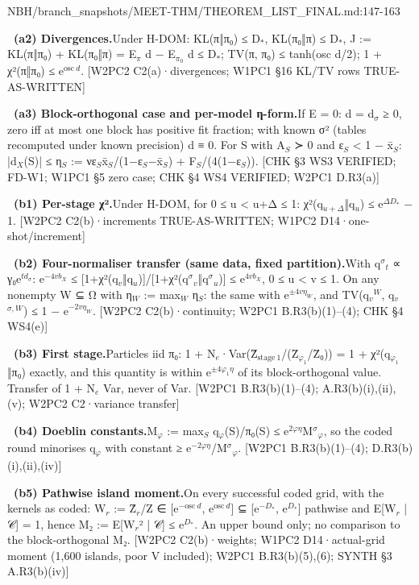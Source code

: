 \begin{stmt}{NBH/branch_snapshots/MEET-THM/THEOREM_LIST_FINAL.md:147-163}
\par\smallskip\noindent\textbf{\ (a2) Divergences.}\enspace Under H-DOM: KL(π‖π₀) ≤ D$_{*}$, KL(π₀‖π) ≤ D$_{*}$, J := KL(π‖π₀) + KL(π₀‖π) = E$_{π}$ d − E$_{π_{0}}$ d ≤ D$_{*}$; TV(π, π₀) ≤ tanh(osc d/2); 1 + χ²(π‖π₀) ≤ e$^{\mathrm{osc}\ d}$. [W2PC2 C2(a)·divergences; W1PC1 §16 KL/TV rows TRUE-AS-WRITTEN]
\par\smallskip\noindent\textbf{\ (a3) Block-orthogonal case and per-model η-form.}\enspace If E = 0: d = d$_{σ}$ ≥ 0, zero iff at most one block has positive fit fraction; with known σ² (tables recomputed under known precision) d ≡ 0. For S with A$_{S}$ ≻ 0 and ε$_{S}$ \textless{} 1 − x̄$_{S}$: |d$_{X}$(S)| ≤ η$_{S}$ := νε$_{S}$x̄$_{S}$/(1−ε$_{S}$−x̄$_{S}$) + F$_{S}$/(4(1−ε$_{S}$)). [CHK §3 WS3 VERIFIED; FD-W1; W1PC1 §5 zero case; CHK §4 WS4 VERIFIED; W2PC1 D.R3(a)]
\par\smallskip\noindent\textbf{\ (b1) Per-stage χ².}\enspace Under H-DOM, for 0 ≤ u \textless{} u+Δ ≤ 1: χ²(q$_{u+Δ}$‖q$_{u}$) ≤ e$^{ΔD_{*}}$ − 1. [W2PC2 C2(b)·increments TRUE-AS-WRITTEN; W1PC2 D14·one-shot/increment]
\par\smallskip\noindent\textbf{\ (b2) Four-normaliser transfer (same data, fixed partition).}\enspace With q$^{σ}$$_{t}$ ∝ γ₀e$^{td_{σ}}$: e$^{−4vb_{X}}$ ≤ [1+χ²(q$_{v}$‖q$_{u}$)]/[1+χ²(q$^{σ}$$_{v}$‖q$^{σ}$$_{u}$)] ≤ e$^{4vb_{X}}$, 0 ≤ u \textless{} v ≤ 1. On any nonempty W ⊆ Ω with η$_{W}$ := max$_{W}$ η$_{S}$: the same with e$^{±4vη_{W}}$, and TV(q$_{v}$$^{W}$, q$_{v}$$^{σ,W}$) ≤ 1 − e$^{−2vη_{W}}$. [W2PC2 C2(b)·continuity; W2PC1 B.R3(b)(1)–(4); CHK §4 WS4(e)]
\par\smallskip\noindent\textbf{\ (b3) First stage.}\enspace Particles iid π₀: 1 + N$_{e}$·Var(Ẑ$_{\mathrm{stage}\ 1}$/(Z̄$_{φ_{1}}$/Z̄₀)) = 1 + χ²(q$_{φ_{1}}$‖π₀) exactly, and this quantity is within e$^{±4φ_{1}η}$ of its block-orthogonal value. Transfer of 1 + N$_{e}$ Var, never of Var. [W2PC1 B.R3(b)(1)–(4); A.R3(b)(i),(ii),(v); W2PC2 C2·variance transfer]
\par\smallskip\noindent\textbf{\ (b4) Doeblin constants.}\enspace M$_{φ}$ := max$_{S}$ q$_{φ}$(S)/π₀(S) ≤ e$^{2φη}$M$^{σ}$$_{φ}$, so the coded round minorises q$_{φ}$ with constant ≥ e$^{−2φη}$/M$^{σ}$$_{φ}$. [W2PC1 B.R3(b)(1)–(4); D.R3(b)(i),(ii),(iv)]
\par\smallskip\noindent\textbf{\ (b5) Pathwise island moment.}\enspace On every successful coded grid, with the kernels as coded: W$_{r}$ := Ẑ$_{r}$/Z ∈ [e$^{−\mathrm{osc}\ d}$, e$^{\mathrm{osc}\ d}$] ⊆ [e$^{−D_{*}}$, e$^{D_{*}}$] pathwise and E[W$_{r}$ | 𝒞] = 1, hence M₂ := E[W$_{r}$² | 𝒞] ≤ e$^{D_{*}}$. An upper bound only; no comparison to the block-orthogonal M₂. [W2PC2 C2(b)·weights; W1PC2 D14·actual-grid moment (1,600 islands, poor V included); W2PC1 B.R3(b)(5),(6); SYNTH §3 A.R3(b)(iv)]
$$
\end{stmt}
